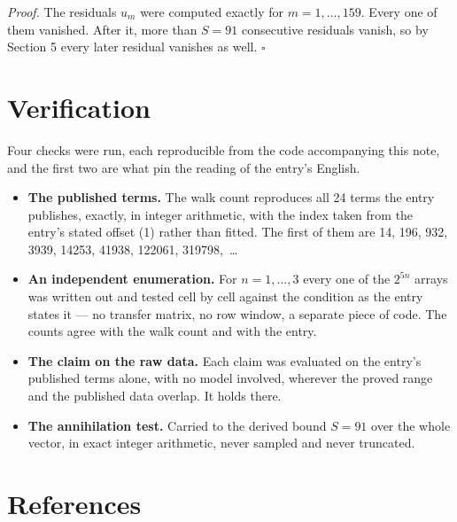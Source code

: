 \documentclass[11pt]{article}
\theoremstyle{definition}
\begin{document}
{\itshape Proof.} The residuals $u_m$ were computed exactly for $m = 1,\dots,159$. Every one of them vanished. After it, more than $S = 91$ consecutive residuals vanish, so by Section 5 every later residual vanishes as well. $\square$

\section{Verification}

Four checks were run, each reproducible from the code accompanying this note, and the first two are what pin the reading of the entry's English.

\begin{itemize}

\item {\bfseries The published terms.} The walk count reproduces all 24 terms the entry publishes, exactly, in integer arithmetic, with the index taken from the entry's stated offset (1) rather than fitted. The first of them are 14, 196, 932, 3939, 14253, 41938, 122061, 319798,~\dots

\item {\bfseries An independent enumeration.} For $n = 1,\dots,3$ every one of the $2^{5n}$ arrays was written out and tested cell by cell against the condition as the entry states it --- no transfer matrix, no row window, a separate piece of code. The counts agree with the walk count and with the entry.

\item {\bfseries The claim on the raw data.} Each claim was evaluated on the entry's published terms alone, with no model involved, wherever the proved range and the published data overlap. It holds there.

\item {\bfseries The annihilation test.} Carried to the derived bound $S = 91$ over the whole vector, in exact integer arithmetic, never sampled and never truncated.

\end{itemize}

\section{References}
\end{document}
